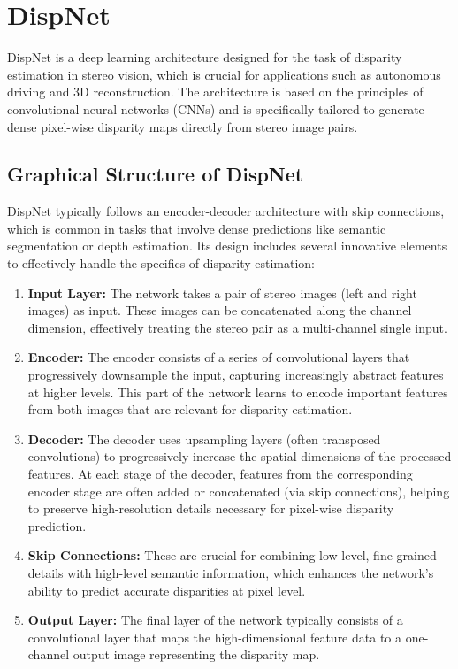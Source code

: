 \documentclass[22pt]{report}
\begin{document}

\section{DispNet}
DispNet is a deep learning architecture designed for the task of disparity estimation in stereo vision, which is crucial for applications such as autonomous driving and 3D reconstruction. The architecture is based on the principles of convolutional neural networks (CNNs) and is specifically tailored to generate dense pixel-wise disparity maps directly from stereo image pairs. \\
\subsection{Graphical Structure of DispNet}
DispNet typically follows an encoder-decoder architecture with skip connections, which is common in tasks that involve dense predictions like semantic segmentation or depth estimation. Its design includes several innovative elements to effectively handle the specifics of disparity estimation:
\begin{enumerate}
    \item \textbf{Input Layer:} The network takes a pair of stereo images (left and right images) as input. These images can be concatenated along the channel dimension, effectively treating the stereo pair as a multi-channel single input.
    \item \textbf{Encoder:} The encoder consists of a series of convolutional layers that progressively downsample the input, capturing increasingly abstract features at higher levels. This part of the network learns to encode important features from both images that are relevant for disparity estimation.
    \item \textbf{Decoder:} The decoder uses upsampling layers (often transposed convolutions) to progressively increase the spatial dimensions of the processed features. At each stage of the decoder, features from the corresponding encoder stage are often added or concatenated (via skip connections), helping to preserve high-resolution details necessary for pixel-wise disparity prediction.
    \item \textbf{Skip Connections:} These are crucial for combining low-level, fine-grained details with high-level semantic information, which enhances the network's ability to predict accurate disparities at pixel level.
    \item \textbf{Output Layer:} The final layer of the network typically consists of a convolutional layer that maps the high-dimensional feature data to a one-channel output image representing the disparity map.
\end{enumerate}
\vspace{10}
\end{document}
